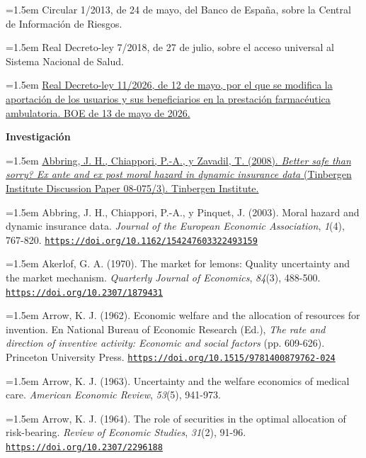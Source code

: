 \documentclass[10pt,a4paper]{article}
\begin{document}
\noindent\hangindent=1.5em Circular 1/2013, de 24 de mayo, del Banco de España, sobre la Central de Información de Riesgos.

\noindent\hangindent=1.5em Real Decreto-ley 7/2018, de 27 de julio, sobre el acceso universal al Sistema Nacional de Salud.

\noindent\hangindent=1.5em \href{https://www.boe.es/diario_boe/txt.php?id=BOE-A-2026-10324}{Real Decreto-ley 11/2026, de 12 de mayo, por el que se modifica la aportación de los usuarios y sus beneficiarios en la prestación farmacéutica ambulatoria. BOE de 13 de mayo de 2026.}

\textbf{Investigación}

\noindent\hangindent=1.5em \href{https://papers.tinbergen.nl/08075.pdf}{Abbring, J. H., Chiappori, P.-A., y Zavadil, T. (2008). \textit{Better safe than sorry? Ex ante and ex post moral hazard in dynamic insurance data} (Tinbergen Institute Discussion Paper 08-075/3). Tinbergen Institute.}

\noindent\hangindent=1.5em Abbring, J. H., Chiappori, P.-A., y Pinquet, J. (2003). Moral hazard and dynamic insurance data. \textit{Journal of the European Economic Association}, \textit{1}(4), 767-820. \href{https://doi.org/10.1162/154247603322493159}{\nolinkurl{https://doi.org/10.1162/154247603322493159}}

\noindent\hangindent=1.5em Akerlof, G. A. (1970). The market for lemons: Quality uncertainty and the market mechanism. \textit{Quarterly Journal of Economics}, \textit{84}(3), 488-500. \href{https://doi.org/10.2307/1879431}{\nolinkurl{https://doi.org/10.2307/1879431}}

\noindent\hangindent=1.5em Arrow, K. J. (1962). Economic welfare and the allocation of resources for invention. En National Bureau of Economic Research (Ed.), \textit{The rate and direction of inventive activity: Economic and social factors} (pp. 609-626). Princeton University Press. \href{https://doi.org/10.1515/9781400879762-024}{\nolinkurl{https://doi.org/10.1515/9781400879762-024}}

\noindent\hangindent=1.5em Arrow, K. J. (1963). Uncertainty and the welfare economics of medical care. \textit{American Economic Review}, \textit{53}(5), 941-973.

\noindent\hangindent=1.5em Arrow, K. J. (1964). The role of securities in the optimal allocation of risk-bearing. \textit{Review of Economic Studies}, \textit{31}(2), 91-96. \href{https://doi.org/10.2307/2296188}{\nolinkurl{https://doi.org/10.2307/2296188}}
\end{document}
